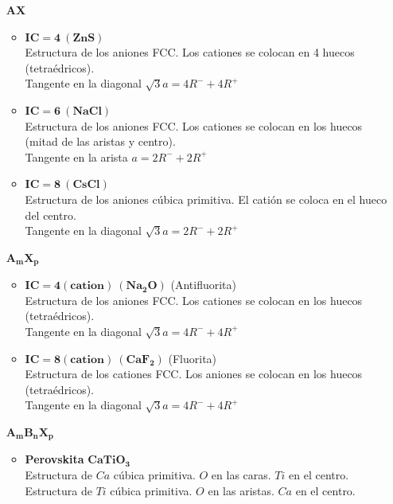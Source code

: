 \documentclass[12pt]{article}
\begin{document}
		\begin{itemize}
			\item[$\mathbf{AX}$]
			\begin{itemize}
				\item $\mathbf{IC=4 \ (ZnS)}$\\
				Estructura de los aniones FCC. Los cationes se colocan en 4 huecos (tetraédricos).\\
				Tangente en la diagonal $\sqrt{3}a=4R^-+4R^+$
				\item $\mathbf{IC=6 \ (NaCl)}$\\
				Estructura de los aniones FCC. Los cationes se colocan en los huecos (mitad de las aristas y centro).\\
				Tangente en la arista $a=2R^-+2R^+$
				\item $\mathbf{IC=8 \ (CsCl)}$\\
				Estructura de los aniones cúbica primitiva. El catión se coloca en el hueco del centro.\\
				Tangente en la diagonal $\sqrt{3}a=2R^-+2R^+$
			\end{itemize}
			
			\item[$\mathbf{A_mX_p}$]
			\begin{itemize}
				\item $\mathbf{IC=4 (cation) \ (Na_2O)}$ (Antifluorita)\\
				Estructura de los aniones FCC. Los cationes se colocan en los huecos (tetraédricos).\\
				Tangente en la diagonal $\sqrt{3}a=4R^-+4R^+$
				\item $\mathbf{IC=8 (cation) \ (CaF_2)}$ (Fluorita)\\
				Estructura de los cationes FCC. Los aniones se colocan en los huecos (tetraédricos).\\
				Tangente en la diagonal $\sqrt{3}a=4R^-+4R^+$
			\end{itemize}
			\item[$\mathbf{A_mB_nX_p}$]
			\begin{itemize}
				\item \textbf{Perovskita} $\mathbf{CaTiO_3}$ \\
				Estructura de $Ca$ cúbica primitiva. $O$ en las caras. $Ti$ en el centro. \\
				Estructura de $Ti$ cúbica primitiva. $O$ en las aristas. $Ca$ en el centro.
			\end{itemize}
		\end{itemize}
		
\end{document}
